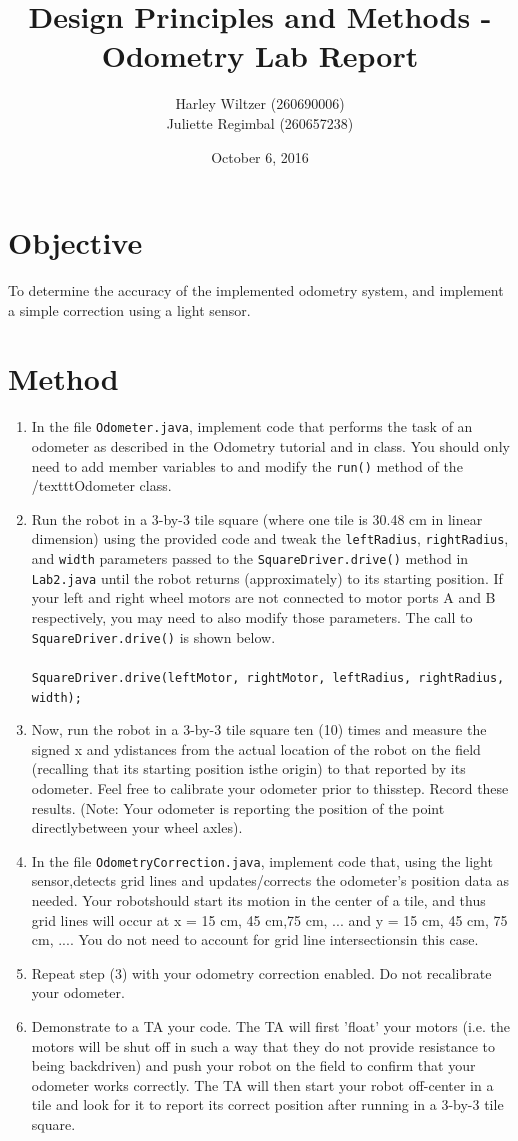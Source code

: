 \documentclass[11pt]{article} %
\title{Design Principles and Methods - Odometry Lab Report}
\author{Harley Wiltzer (260690006)\\Juliette Regimbal (260657238)}
\date{October 6, 2016} %
\begin{document}
\maketitle

\section{Objective}
To determine the accuracy of the implemented odometry system, and implement a simple correction using a light sensor.
\section{Method}
\begin{enumerate}
\item In the file \texttt{Odometer.java}, implement code that performs the task of an odometer as
described in the Odometry tutorial and in class. You should only need to add member variables
to and modify the \texttt{run()} method of the /texttt{Odometer} class.
\item Run the robot in a 3-by-3 tile square (where one tile is 30.48 cm in linear dimension) using the
provided code and tweak the \texttt{leftRadius}, \texttt{rightRadius}, and \texttt{width} parameters passed
to the \texttt{SquareDriver.drive()} method in \texttt{Lab2.java} until the robot returns
(approximately) to its starting position. If your left and right wheel motors are not connected to
motor ports A and B respectively, you may need to also modify those parameters. The call to
\texttt{SquareDriver.drive()} is shown below.\\
\\
\texttt{SquareDriver.drive(leftMotor, rightMotor, leftRadius, rightRadius, width);}
\item Now, run the robot in a 3-by-3 tile square ten (10) times and measure the signed x and ydistances from the actual location of the robot on the field (recalling that its starting position isthe origin) to that reported by its odometer. Feel free to calibrate your odometer prior to thisstep. Record these results. (Note: Your odometer is reporting the position of the point directlybetween your wheel axles).
\item In the file \texttt{OdometryCorrection.java}, implement code that, using the light sensor,detects grid lines and updates/corrects the odometer's position data as needed. Your robotshould start its motion in the center of a tile, and thus grid lines will occur at x = 15 cm, 45 cm,75 cm, ... and y = 15 cm, 45 cm, 75 cm, .... You do not need to account for grid line intersectionsin this case.
\item Repeat step (3) with your odometry correction enabled. Do not recalibrate your odometer.
\item Demonstrate to a TA your code. The TA will first 'float' your motors (i.e. the motors will be shut off in such a way that they do not provide resistance to being backdriven) and push your robot on the field to confirm that your odometer works correctly. The TA will then start your robot off-center in a tile and look for it to report its correct position after running in a 3-by-3 tile square.
\end{enumerate}
\end{document}
